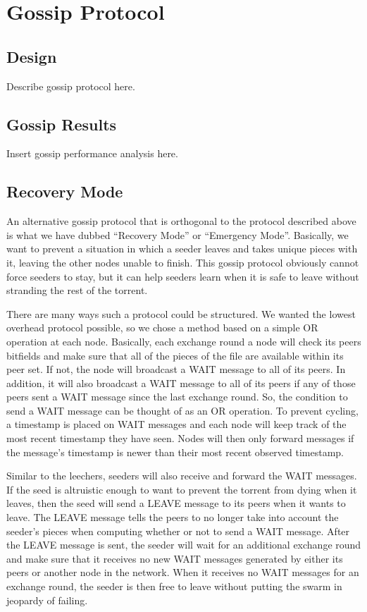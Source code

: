 \section{Gossip Protocol}

\subsection{Design}

Describe gossip protocol here.

\subsection{Gossip Results}

Insert gossip performance analysis here.

\subsection{Recovery Mode}

An alternative gossip protocol that is orthogonal to the protocol described above is 
what we have dubbed ``Recovery Mode'' or ``Emergency Mode''. Basically, we
want to prevent a situation in which a seeder leaves and takes unique pieces
with it, leaving the other nodes unable to finish. This gossip protocol obviously
cannot force seeders to stay, but it can help seeders learn when it is safe to
leave without stranding the rest of the torrent. 

There are many ways such a protocol could be structured. We wanted the lowest
overhead protocol possible, so we chose a method based on a simple OR operation
at each node. Basically, each exchange round a node will check its peers bitfields
and make sure that all of the pieces of the file are available within its peer
set. If not, the node will broadcast a WAIT message to all of its peers. In addition, it will
also broadcast a WAIT message to all of its peers if any of those peers sent a 
WAIT message since the last exchange round. So, the condition to send a WAIT message 
can be thought of as an OR operation. To prevent cycling, a timestamp is placed
on WAIT messages and each node will keep track of the most recent timestamp they have seen. 
Nodes will then only forward messages if the message's timestamp is newer than their most 
recent observed timestamp.

Similar to the leechers, seeders will also receive and forward the WAIT messages. If the 
seed is altruistic enough to want to prevent the torrent from dying when it leaves,
then the seed will send a LEAVE message to its peers when it wants to leave. The LEAVE
message tells the peers to no longer take into account the seeder's pieces when computing
whether or not to send a WAIT message. After the LEAVE message is sent, the seeder will
wait for an additional exchange round and make sure that it receives no new WAIT messages
generated by either its peers or another node in the network. When it receives no WAIT
messages for an exchange round, the seeder is then free to leave without putting the 
swarm in jeopardy of failing. 


